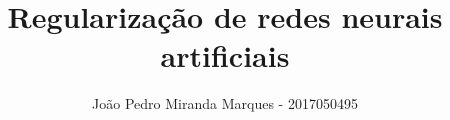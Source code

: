 \documentclass[10pt]{article}
\title{\LARGE \bf
Regularização de redes neurais artificiais 
}
\author{João Pedro Miranda Marques - 2017050495}
\begin{document}


\begin{multicols}{2}











\end{multicols}
\pagebreak
\printbibliography
\end{document}
